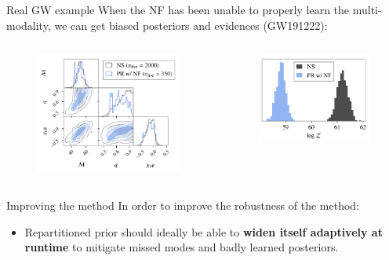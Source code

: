 \documentclass[aspectratio=169, 11pt]{beamer}
\begin{document}
\begin{frame}{Real GW example}
    When the NF has been unable to properly learn the multi-modality, we can get biased posteriors and evidences (GW191222):
 
    \begin{columns}

\begin{figure}
    \centering
    \includegraphics[width=0.75\linewidth]{Ca_Foscari Beamer/presentation_GW191222_1.pdf}
\end{figure}

\begin{figure}
    \centering
    \includegraphics[width=0.75\linewidth]{Ca_Foscari Beamer/presentation_logZ_GW191222.pdf}
\end{figure}
\end{columns}
    
\end{frame}

\begin{frame}{Improving the method}
    In order to improve the robustness of the method: \vfill
    \begin{itemize}
        \item Repartitioned prior should ideally be able to \textbf{widen itself adaptively at runtime} to mitigate missed modes and badly learned posteriors.
    \end{itemize}
\end{frame}
\end{document}
